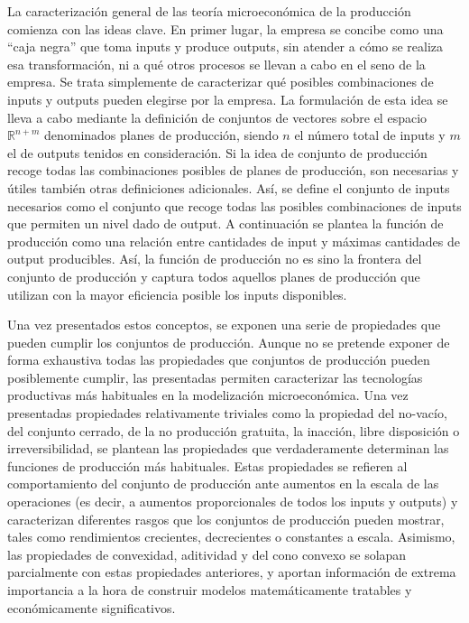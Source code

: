 \documentclass{nuevotema}
\begin{document}
La caracterización general de las teoría microeconómica de la producción comienza con las ideas clave. En primer lugar, la empresa se concibe como una ``caja negra'' que toma inputs y produce outputs, sin atender a cómo se realiza esa transformación, ni a qué otros procesos se llevan a cabo en el seno de la empresa. Se trata simplemente de caracterizar qué posibles combinaciones de inputs y outputs pueden elegirse por la empresa. La formulación de esta idea se lleva a cabo mediante la definición de conjuntos de vectores sobre el espacio $\mathbb{R}^{n+m}$ denominados planes de producción, siendo $n$ el número total de inputs y $m$ el de outputs tenidos en consideración. Si la idea de conjunto de producción recoge todas las combinaciones posibles de planes de producción, son necesarias y útiles también otras definiciones adicionales. Así, se define el conjunto de inputs necesarios como el conjunto que recoge todas las posibles combinaciones de inputs que permiten un nivel dado de output. A continuación se plantea la función de producción como una relación entre cantidades de input y máximas cantidades de output producibles. Así, la función de producción no es sino la frontera del conjunto de producción y captura todos aquellos planes de producción que utilizan con la mayor eficiencia posible los inputs disponibles.

Una vez presentados estos conceptos, se exponen una serie de propiedades que pueden cumplir los conjuntos de producción. Aunque no se pretende exponer de forma exhaustiva todas las propiedades que conjuntos de producción pueden posiblemente cumplir, las presentadas permiten caracterizar las tecnologías productivas más habituales en la modelización microeconómica. Una vez presentadas propiedades relativamente triviales como la propiedad del no-vacío, del conjunto cerrado, de la no producción gratuita, la inacción, libre disposición o irreversibilidad, se plantean las propiedades que verdaderamente determinan las funciones de producción más habituales. Estas propiedades se refieren al comportamiento del conjunto de producción ante aumentos en la escala de las operaciones (es decir, a aumentos proporcionales de todos los inputs y outputs) y caracterizan diferentes rasgos que los conjuntos de producción pueden mostrar, tales como rendimientos crecientes, decrecientes o constantes a escala. Asimismo, las propiedades de convexidad, aditividad y del cono convexo se solapan parcialmente con estas propiedades anteriores, y aportan información de extrema importancia a la hora de construir modelos matemáticamente tratables y económicamente significativos.
\end{document}

